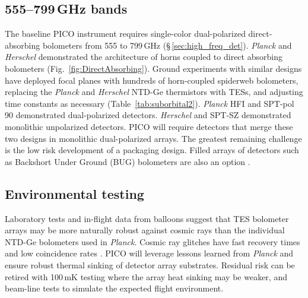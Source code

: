 

\subsection{555--799\,GHz bands}
\label{sec:dev_arrays}

The baseline PICO instrument requires single-color dual-polarized
direct-absorbing bolometers from 555 to 799\,GHz
(\S\,\ref{sec:high_freq_det}).  \textit{Planck} and \textit{Herschel}
demonstrated the architecture of horns coupled to direct absorbing
bolometers (Fig.~\ref{fig:DirectAbsorbing}).  Ground experiments with
similar designs have deployed focal planes with hundreds of
horn-coupled spiderweb bolometers, replacing the \textit{Planck} and
\textit{Herschel} NTD-Ge thermistors with TESs, and adjusting time
constants as necessary (Table~\ref{tab:suborbital2}). \textit{Planck}
HFI and SPT-pol 90 demonstrated dual-polarized
detectors. \textit{Herschel} and SPT-SZ demonstrated monolithic
unpolarized detectors. PICO will require detectors that merge these
two designs in monolithic dual-polarized arrays. The greatest
remaining challenge is the low risk development of a packaging
design. Filled arrays of detectors such as Backshort Under Ground
(BUG) bolometers are also an option \citep{Staguhn2006}.



\subsection{Environmental testing}
\label{sec:env_testing}
Laboratory tests and in-flight data from balloons suggest that TES
bolometer arrays may be more naturally robust against cosmic rays than
the individual NTD-Ge bolometers used in \textit{Planck}. Cosmic ray
glitches have fast recovery times and low coincidence rates
\citep{SPIDER2018,Filippini_inprep}. PICO will leverage lessons
learned from \textit{Planck} and ensure robust thermal sinking of
detector array substrates. Residual risk can be retired with 100\,mK
testing where the array heat sinking may be weaker, and beam-line
tests to simulate the expected flight environment.

